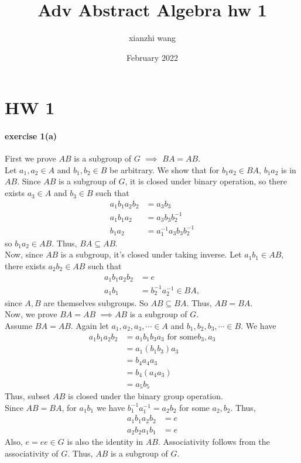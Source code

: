 \documentclass[12pt,english]{article}
\title{Adv Abstract Algebra hw 1}
\author{xianzhi wang}
\date{February 2022}
\begin{document}
\maketitle

\section{HW 1}
\paragraph{exercise 1(a)}
First we prove $AB$ is a subgroup of $G$ $\implies$ $BA = AB$. \\
Let $a_1, a_2 \in A$ and $b_1, b_2 \in B$ be arbitrary. We show that for $b_1a_2\in BA$, $b_1a_2$ is in $AB$. Since $AB$ is a subgroup of $G$, it is closed under binary operation, so there exists $a_3 \in A$ and $b_3 \in B$ such that
\begin{align}
    a_1b_1a_2b_2 &= a_3b_3\\
    a_1b_1a_2 &= a_3b_3b_2^{-1}\\
    b_1a_2 &=a_1^{-1} a_3b_3b_2^{-1}
\end{align}
so $b_1a_2 \in AB$. Thus, $BA \subseteq AB$. \\

Now, since $AB$ is a subgroup, it's closed under taking inverse. Let $a_1b_1 \in AB$, there exists $a_2b_2 \in AB$ such that 
\begin{align}
     a_1b_1a_2b_2&= e\\
     a_1b_1 &= b_2^{-1}a_2^{-1} \in BA,
\end{align} since $A,B$ are themselves subgroups. So $AB\subseteq BA$. Thus, $AB=BA$.\\

Now, we prove $BA = AB$ $\implies AB$ is a subgroup of $G$. \\

Assume $BA=AB$. Again let $a_1, a_2, a_3, \cdots \in A$ and $b_1, b_2, b_3, \cdots \in B$. We have
\begin{align}
    a_1b_1a_2b_2 &= a_1b_1b_3a_3 \text{ for some} b_3, a_3\\
    &= a_1(b_1b_3)a_3\\
    &= b_4a_4a_3\\
    &= b_4(a_4a_3)\\
    &=a_5b_5
\end{align}
Thus, subset $AB$ is closed under the binary group operation.\\

Since $AB=BA$, for $a_1b_1$ we have $b_1^{-1}a_1^{-1}=a_2b_2$ for some $a_2,b_2$. Thus,
\begin{align}
    a_1b_1a_2b_2 &= e\\
    a_2b_2a_1b_1 &= e
\end{align}
Also, $e = ee \in G$ is also the identity in $AB$. Associativity follows from the associativity of $G$. Thus, $AB$ is a subgroup of $G$.
\end{document}
